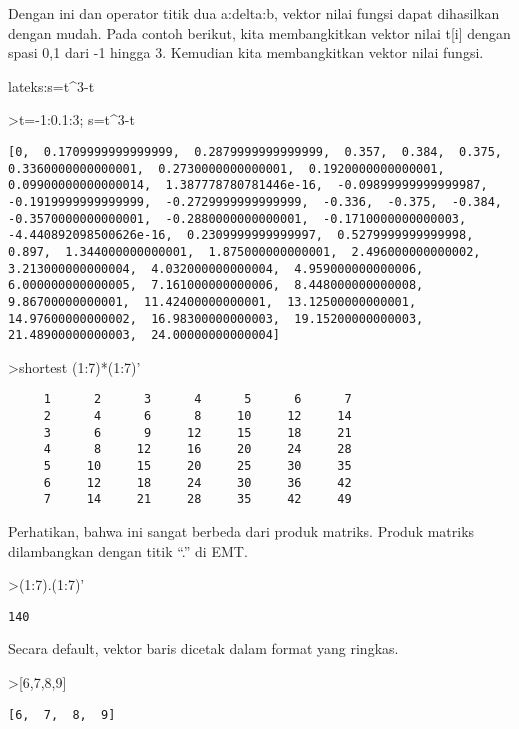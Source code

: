 \documentclass[
]{book}
\begin{document}
Dengan ini dan operator titik dua a:delta:b, vektor nilai fungsi dapat dihasilkan dengan mudah. Pada contoh berikut, kita membangkitkan vektor nilai t{[}i{]} dengan spasi 0,1 dari -1 hingga 3. Kemudian kita membangkitkan vektor nilai fungsi.

lateks:s=t\^{}3-t

\textgreater t=-1:0.1:3; s=t\^{}3-t

\begin{verbatim}
[0,  0.1709999999999999,  0.2879999999999999,  0.357,  0.384,  0.375,
0.3360000000000001,  0.2730000000000001,  0.1920000000000001,
0.09900000000000014,  1.387778780781446e-16,  -0.09899999999999987,
-0.1919999999999999,  -0.2729999999999999,  -0.336,  -0.375,  -0.384,
-0.3570000000000001,  -0.2880000000000001,  -0.1710000000000003,
-4.440892098500626e-16,  0.2309999999999997,  0.5279999999999998,
0.897,  1.344000000000001,  1.875000000000001,  2.496000000000002,
3.213000000000004,  4.032000000000004,  4.959000000000006,
6.000000000000005,  7.161000000000006,  8.448000000000008,
9.86700000000001,  11.42400000000001,  13.12500000000001,
14.97600000000002,  16.98300000000003,  19.15200000000003,
21.48900000000003,  24.00000000000004]
\end{verbatim}

\textgreater shortest (1:7)*(1:7)'

\begin{verbatim}
     1      2      3      4      5      6      7 
     2      4      6      8     10     12     14 
     3      6      9     12     15     18     21 
     4      8     12     16     20     24     28 
     5     10     15     20     25     30     35 
     6     12     18     24     30     36     42 
     7     14     21     28     35     42     49 
\end{verbatim}

Perhatikan, bahwa ini sangat berbeda dari produk matriks. Produk matriks dilambangkan dengan titik ``.'' di EMT.

\textgreater(1:7).(1:7)'

\begin{verbatim}
140
\end{verbatim}

Secara default, vektor baris dicetak dalam format yang ringkas.

\textgreater{[}6,7,8,9{]}

\begin{verbatim}
[6,  7,  8,  9]
\end{verbatim}
\end{document}
